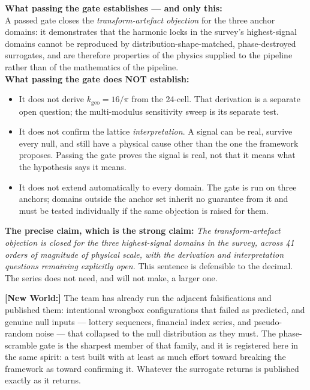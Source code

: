 \documentclass[11pt, letterpaper, openany]{book}
\newcommand{\newworld}[1]{\noindent\textbf{\color{kishblue}[New World:]} #1\medskip}
\begin{document}
\begin{warningbox}
\textbf{What passing the gate establishes --- and only this:}\\[0.5em]
A passed gate closes the \emph{transform-artefact objection} for the three anchor
domains: it demonstrates that the harmonic locks in the survey's highest-signal domains
cannot be reproduced by distribution-shape-matched, phase-destroyed surrogates, and are
therefore properties of the physics supplied to the pipeline rather than of the
mathematics of the pipeline.\\[0.5em]
\textbf{What passing the gate does NOT establish:}
\begin{itemize}
\item It does not derive $k_\text{geo} = 16/\pi$ from the 24-cell. That derivation is a
separate open question; the multi-modulus sensitivity sweep is its separate test.
\item It does not confirm the lattice \emph{interpretation}. A signal can be real,
survive every null, and still have a physical cause other than the one the framework
proposes. Passing the gate proves the signal is real, not that it means what the
hypothesis says it means.
\item It does not extend automatically to every domain. The gate is run on three
anchors; domains outside the anchor set inherit no guarantee from it and must be tested
individually if the same objection is raised for them.
\end{itemize}
\textbf{The precise claim, which is the strong claim:} \emph{The transform-artefact
objection is closed for the three highest-signal domains in the survey, across 41 orders
of magnitude of physical scale, with the derivation and interpretation questions
remaining explicitly open.} This sentence is defensible to the decimal. The series does
not need, and will not make, a larger one.
\end{warningbox}
 
\newworld{The team has already run the adjacent falsifications and published them:
intentional wrongbox configurations that failed as predicted, and genuine null inputs
--- lottery sequences, financial index series, and pseudo-random noise --- that
collapsed to the null distribution as they must. The phase-scramble gate is the sharpest
member of that family, and it is registered here in the same spirit: a test built with
at least as much effort toward breaking the framework as toward confirming it. Whatever
the surrogate returns is published exactly as it returns.}
\end{document}
